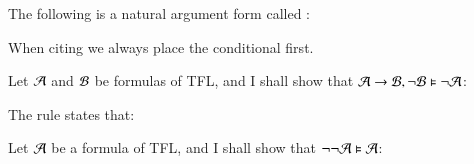 \documentclass[12pt, a4paper, twoside, openright, titlepage]{book}
\begin{document}
\begin{defn}{}{}
    The following is a natural argument form called : \begin{fitchproof}
         
    \end{fitchproof}
    When citing we always place the conditional first.
\end{defn}
\begin{proof*}{}{}
    Let $\mathcal{A}$ and $\mathcal{B}$ be formulas of TFL, and I shall show that $\mathcal{A}\rightarrow\mathcal{B},\neg\mathcal{B}\vDash \neg\mathcal{A}$:
    \begin{fitchproof}
        \open
             
             
        \close
         
    \end{fitchproof}
\end{proof*}


\begin{defn}{}{}
    The  rule states that: \begin{fitchproof}
         
    \end{fitchproof}
\end{defn}
\begin{proof*}{}{}
    Let $\mathcal{A}$ be a formula of TFL, and I shall show that $\neg\neg\mathcal{A}\vDash \mathcal{A}$:
    \begin{fitchproof}
        \open
             
        \close
         
    \end{fitchproof}
\end{proof*}
\end{document}
